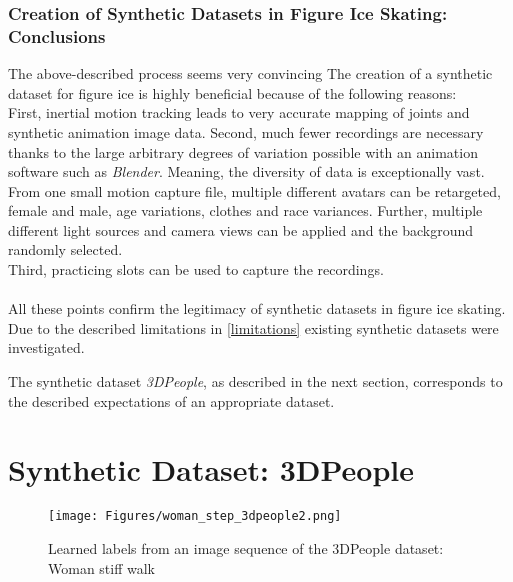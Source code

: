 \subsubsection*{Creation of Synthetic Datasets in Figure Ice Skating: Conclusions}
The above-described process seems very convincing
The creation of a synthetic dataset for figure ice is highly beneficial
because of the following reasons:\\
First, inertial motion tracking leads to very accurate mapping of joints and synthetic animation image data.
Second, much fewer recordings are necessary thanks to the large arbitrary degrees of variation possible with
an animation software such as \textit{Blender}.
Meaning, the diversity of data is exceptionally vast.
From one small motion capture file, multiple different avatars can be retargeted, female and male, age variations,
clothes and race variances.
Further, multiple different light sources and camera views can be applied and the background randomly selected.\\
Third, practicing slots can be used to capture the recordings.
\\\mbox{}\\
All these points confirm the legitimacy of synthetic datasets in figure ice skating.
Due to the described limitations in \autoref{limitations} existing synthetic datasets were investigated.

The synthetic dataset \textit{3DPeople}, as described in the next section, corresponds to the described expectations of an appropriate dataset.




\section{Synthetic Dataset: 3DPeople}

\begin{figure}
    \centering
    \texttt{[image: Figures/woman\_step\_3dpeople2.png]}
    \decoRule
    \caption[3DPeople: Woman stiff walk (labeled)]{Learned labels from an image sequence of the 3DPeople dataset: Woman stiff walk}
    \label{fig:woman_step_3dpeople}
\end{figure}


